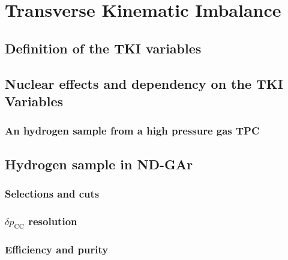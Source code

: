 \begin{savequote}[8cm]
\end{savequote}

\chapter{\label{ch:6-TKI}Transverse Kinematic Imbalance}


\minitoc
\section{Definition of the TKI variables}
\section{Nuclear effects and dependency on the TKI Variables}
\subsection{An hydrogen sample from a high pressure gas TPC}
\section{Hydrogen sample in ND-GAr}
\subsection{Selections and cuts}
\subsection{$\delta p_\textrm{CC}$ resolution}
\subsection{Efficiency and purity}
